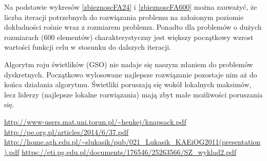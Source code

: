 \documentclass[11pt,a4paper,twoside]{article}
\begin{document}
Na podstawie wykresów \ref{zbieznoscFA24} i \ref{zbieznoscFA600} można zauważyć, że liczba iteracji potrzebnych do rozwiązania problemu na założonym poziomie dokładności rośnie wraz z rozmiarem problemu. Ponadto dla problemów o dużych rozmiarach (600 elementów) charakterystyczny jest większy początkowy wzrost wartości funkcji celu w stosunku do dalszych iteracji.

Algorytm roju świetlików (GSO) nie nadaje się naszym zdaniem do problemów dyskretnych. Początkowo wylosowane najlepsze rozwiązanie pozostaje nim aż do końca działania algorytmu. Świetliki poruszają się wokół lokalnych maksimów, lecz liderzy (najlepsze lokalne rozwiązania) mają zbyt małe możliwości poruszania się.



\begin{thebibliography}{9}
\url{http://www-users.mat.uni.torun.pl/~henkej/knapsack.pdf}
\url{http://pe.org.pl/articles/2014/6/37.pdf}
\url{http://home.agh.edu.pl/~slukasik/pub/021_Lukasik_KAEiOG2011(presentation).pdf}
\url{https://eti.pg.edu.pl/documents/176546/25263566/SZ_wyklad2.pdf}

\end{thebibliography}
\end{document}
